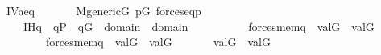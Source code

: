 \begin{isabelle}
\isamarkupfalse%
\ IV{}{}{}a{\isacharunderscore}eq{\isacharcolon}\isanewline
\ \ \isanewline
\ \ \ \ {\isachardoublequoteopen}M{\isacharunderscore}generic{\isacharparenleft}G{\isacharparenright}{\isachardoublequoteclose}\ {\isachardoublequoteopen}p{\isasymin}G{\isachardoublequoteclose}\ {\isachardoublequoteopen}forces{\isacharunderscore}eq{\isacharparenleft}p{\isacharcomma}{\isasymtau}{\isacharcomma}{\isasymtheta}{\isacharparenright}{\isachardoublequoteclose}\isanewline
\ \ \ \ \isanewline
\ \ \ \ IH{\isacharcolon}{\isachardoublequoteopen}{\isasymAnd}q\ {\isasymsigma}{\isachardot}\ q{\isasymin}P\ {\isasymLongrightarrow}\ q{\isasymin}G\ {\isasymLongrightarrow}\ {\isasymsigma}{\isasymin}domain{\isacharparenleft}{\isasymtau}{\isacharparenright}\ {\isasymunion}\ domain{\isacharparenleft}{\isasymtheta}{\isacharparenright}\ {\isasymLongrightarrow}\ \isanewline
\ \ \ \ \ \ \ \ {\isacharparenleft}forces{\isacharunderscore}mem{\isacharparenleft}q{\isacharcomma}{\isasymsigma}{\isacharcomma}{\isasymtau}{\isacharparenright}\ {\isasymlongrightarrow}\ val{\isacharparenleft}G{\isacharcomma}{\isasymsigma}{\isacharparenright}\ {\isasymin}\ val{\isacharparenleft}G{\isacharcomma}{\isasymtau}{\isacharparenright}{\isacharparenright}\ {\isasymand}\isanewline
\ \ \ \ \ \ \ \ {\isacharparenleft}forces{\isacharunderscore}mem{\isacharparenleft}q{\isacharcomma}{\isasymsigma}{\isacharcomma}{\isasymtheta}{\isacharparenright}\ {\isasymlongrightarrow}\ val{\isacharparenleft}G{\isacharcomma}{\isasymsigma}{\isacharparenright}\ {\isasymin}\ val{\isacharparenleft}G{\isacharcomma}{\isasymtheta}{\isacharparenright}{\isacharparenright}{\isachardoublequoteclose}\isanewline
\ \ \isanewline
\ \ \ \ {\isachardoublequoteopen}val{\isacharparenleft}G{\isacharcomma}{\isasymtau}{\isacharparenright}\ {\isacharequal}\ val{\isacharparenleft}G{\isacharcomma}{\isasymtheta}{\isacharparenright}{\isachardoublequoteclose}
\end{isabelle}

